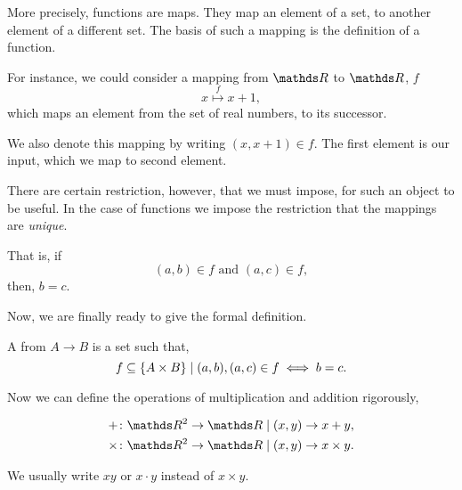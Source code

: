 More precisely, functions are maps. They map an element of a set, to another 
element of a different set. The basis of such a mapping is the definition of a 
function.

For instance, we could consider a mapping from \(\RR\) to \(\RR\), \(f\) 
\begin{equation*}
    x \overset{f}{\mapsto} x + 1,
\end{equation*}
which maps an element from the set of real numbers, to its successor.

We also denote this mapping by writing \((x, x + 1) \in f\). The first element 
is our input, which we map to second element. 

There are certain restriction, however, that we must impose, for such an object 
to be useful. In the case of functions we impose the restriction 
that the mappings are \emph{unique}. 

That is, if 
\begin{equation*}
    (a, b) \in f \text{ and } (a, c) \in f, 
\end{equation*}
then, \(b = c\).

Now, we are finally ready to give the formal definition.

\begin{definition}
    A  from \(A \to B\) is a set such that,
    \begin{equation}
        f \subseteq \left\{A \times B\right\} \mid (a, b), (a, c) \in f \iff b = c.
    \end{equation}
\end{definition}

Now we can define the operations of multiplication and addition rigorously, 

\begin{align*}
    + \colon &\RR^2 \to \RR \given (x, y) \to x + y, \\
    \times \colon &\RR^2 \to \RR \given (x, y) \to x \times y.
\end{align*}

We usually write \(xy\) or \(x \cdot y\) instead of \(x \times y\).


